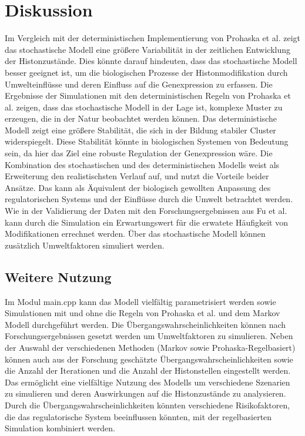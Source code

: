 \documentclass{SeminarV2}
\begin{document}
\section{Diskussion}
Im Vergleich mit der deterministischen Implementierung von Prohaska et al. zeigt das stochastische Modell eine größere Variabilität in der zeitlichen Entwicklung der Histonzustände. Dies könnte darauf hindeuten, dass das stochastische Modell besser geeignet ist, um die biologischen Prozesse der Histonmodifikation durch Umwelteinflüsse und deren Einfluss auf die Genexpression zu erfassen. Die Ergebnisse der Simulationen mit den deterministischen Regeln von Prohaska et al. zeigen, dass das stochastische Modell in der Lage ist, komplexe Muster zu erzeugen, die in der Natur beobachtet werden können.
Das deterministische Modell zeigt eine größere Stabilität, die sich in der Bildung stabiler Cluster widerspiegelt. Diese Stabilität könnte in biologischen Systemen von Bedeutung sein, da hier das Ziel eine robuste Regulation der Genexpression wäre.
Die Kombination des stochastischen und des deterministischen Modells weist als Erweiterung den realistischsten Verlauf auf, und nutzt die Vorteile beider Ansätze. 
Das kann als Äquivalent der biologisch gewollten Anpassung des regulatorischen Systems und der Einflüsse durch die Umwelt betrachtet werden.
Wie in der Validierung der Daten mit den Forschungsergebnissen aus Fu et al. kann durch die Simulation ein Erwartungswert für die erwatete Häufigkeit von Modifikationen errechnet werden. Über das stochastische Modell können zusätzlich Umweltfaktoren simuliert werden.
\subsection{Weitere Nutzung}
Im Modul main.cpp kann das Modell vielfältig parametrisiert werden sowie Simulationen mit und ohne die Regeln von Prohaska et al. und dem Markov Modell durchgeführt werden. Die Übergangswahrscheinlichkeiten können nach Forschungsergebnissen gesetzt werden um Umweltfaktoren zu simulieren. Neben der Auswahl der verschiedenen Methoden (Markov sowie Prohaska-Regelbasiert) können auch aus der Forschung geschätzte Übergangswahrscheinlichkeiten sowie die Anzahl der Iterationen und die Anzahl der Histonstellen eingestellt werden.
Das ermöglicht eine vielfältige Nutzung des Modells um verschiedene Szenarien zu simulieren und deren Auswirkungen auf die Histonzustände zu analysieren.
Durch die Übergangswahrscheinlichkeiten könnten verschiedene Risikofaktoren, die das regulatorische System beeinflussen könnten, mit der regelbasierten Simulation kombiniert werden.
\end{document}
